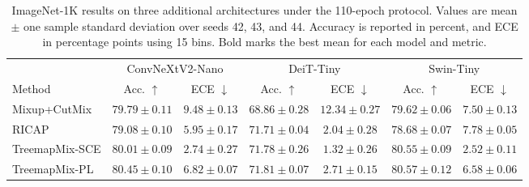 \begin{table}[htbp]
  \caption{ImageNet-1K results on three additional architectures under the 110-epoch protocol. Values are mean $\pm$ one sample standard deviation over seeds 42, 43, and 44. Accuracy is reported in percent, and ECE in percentage points using 15 bins. Bold marks the best mean for each model and metric.}
  \label{tab:architecture-results}
  \centering
  \footnotesize
  \setlength{\tabcolsep}{4pt}
  \begin{tabular}{@{}lcccccc@{}}
    \toprule
     & \multicolumn{2}{c}{ConvNeXtV2-Nano} & \multicolumn{2}{c}{DeiT-Tiny} & \multicolumn{2}{c}{Swin-Tiny} \\
    \cmidrule(lr){2-3} \cmidrule(lr){4-5} \cmidrule(lr){6-7}
    Method & Acc. $\uparrow$ & ECE $\downarrow$ & Acc. $\uparrow$ & ECE $\downarrow$ & Acc. $\uparrow$ & ECE $\downarrow$ \\
    \midrule
    Mixup+CutMix & $79.79 \pm 0.11$ & $9.48 \pm 0.13$ & $68.86 \pm 0.28$ & $12.34 \pm 0.27$ & $79.62 \pm 0.06$ & $7.50 \pm 0.13$ \\
    RICAP & $79.08 \pm 0.10$ & $5.95 \pm 0.17$ & $71.71 \pm 0.04$ & $2.04 \pm 0.28$ & $78.68 \pm 0.07$ & $7.78 \pm 0.05$ \\
    TreemapMix-SCE & $80.01 \pm 0.09$ & $\mathbf{2.74 \pm 0.27}$ & $71.78 \pm 0.26$ & $\mathbf{1.32 \pm 0.26}$ & $80.55 \pm 0.09$ & $\mathbf{2.52 \pm 0.11}$ \\
    TreemapMix-PL & $\mathbf{80.45 \pm 0.10}$ & $6.82 \pm 0.07$ & $\mathbf{71.81 \pm 0.07}$ & $2.71 \pm 0.15$ & $\mathbf{80.57 \pm 0.12}$ & $6.58 \pm 0.06$ \\
    \bottomrule
  \end{tabular}
\end{table}
